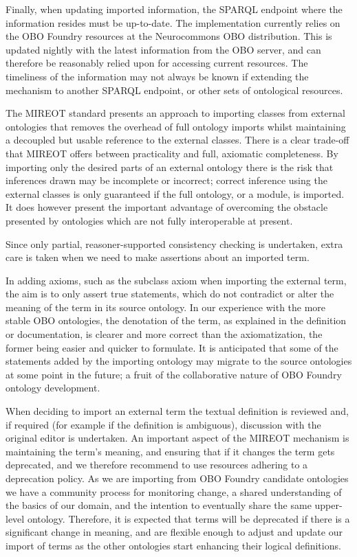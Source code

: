 \documentclass[jou]{ao2e}%
\begin{document}
Finally, when updating imported information, the SPARQL endpoint where the information resides must be up-to-date. The implementation currently relies on the \ac{OBO} Foundry resources at the Neurocommons \ac{OBO} distribution. This is updated nightly with the latest information from the \ac{OBO} server, and can therefore be reasonably relied upon for accessing current resources. The timeliness of the information may not always be known if extending the mechanism to another SPARQL endpoint, or other sets of ontological resources.

The \ac{MIREOT} standard presents an approach to importing classes from external ontologies that removes the overhead of full ontology imports whilst maintaining a decoupled but usable reference to the external classes. There is a clear trade-off that \ac{MIREOT} offers between practicality and full, axiomatic completeness. By importing only the desired parts of an external ontology there is the risk that inferences drawn may be incomplete or incorrect; correct inference using the external classes is only guaranteed if the full ontology, or a module, is imported. It does however present the important advantage of overcoming the obstacle presented by ontologies which are not fully interoperable at present.

Since only partial, reasoner-supported consistency checking is undertaken, extra care is taken when we need to make assertions about an imported term.

In adding axioms, such as the subclass axiom when importing the external term, the aim is to only assert true statements, which do not contradict or alter the meaning of the term in its source ontology.
In our experience with the more stable OBO ontologies, the denotation of the term, as explained in the definition or documentation, is clearer and more correct than the axiomatization, the former being easier and quicker to formulate.
It is anticipated that some of the statements added by the importing ontology may migrate to the source ontologies at some point in the future; a fruit of the collaborative nature of OBO Foundry ontology development.

When deciding to import an external term the textual definition is reviewed and, if required (for example if the definition is ambiguous), discussion with the original editor is undertaken.
An important aspect of the MIREOT mechanism is maintaining the term's meaning, and ensuring that if it changes the term gets deprecated, and we therefore recommend to use resources adhering to a deprecation policy.
As we are importing from \ac{OBO} Foundry candidate ontologies we have a community process for monitoring change, a shared understanding of the basics of our domain, and the intention to eventually share the same upper-level ontology. 
Therefore, it is expected that terms will be deprecated if there is a significant change in meaning, and are flexible enough to adjust and update our import of terms as the other ontologies start enhancing their logical definitions.
\end{document}
